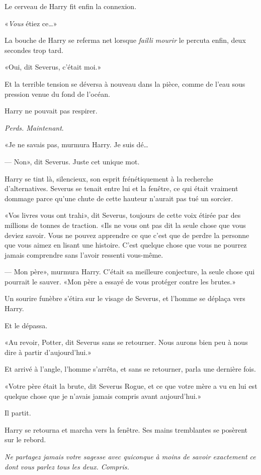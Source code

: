 Le cerveau de Harry fit enfin la connexion.

«\emph{Vous} étiez ce…»

La bouche de Harry se referma net lorsque \emph{failli mourir} le percuta enfin, deux secondes trop tard.

«Oui, dit Severus, c'était moi.»

Et la terrible tension se déversa à nouveau dans la pièce, comme de l'eau sous pression venue du fond de l'océan.

Harry ne pouvait pas respirer.

\emph{Perds. Maintenant}.

«Je ne savais pas, murmura Harry. Je suis dé…

--- Non», dit Severus. Juste cet unique mot.

Harry se tint là, silencieux, son esprit frénétiquement à la recherche d'alternatives. Severus se tenait entre lui et la fenêtre, ce qui était vraiment dommage parce qu'une chute de cette hauteur n'aurait pas tué un sorcier.

«Vos livres vous ont trahi», dit Severus, toujours de cette voix étirée par des millions de tonnes de traction. «Ils ne vous ont pas dit la seule chose que vous deviez savoir. Vous ne pouvez apprendre ce que c'est que de perdre la personne que vous aimez en lisant une histoire. C'est quelque chose que vous ne pourrez jamais comprendre sans l'avoir ressenti vous-même.

--- Mon père», murmura Harry. C'était sa meilleure conjecture, la seule chose qui pourrait le sauver. «Mon père a essayé de vous protéger contre les brutes.»

Un sourire funèbre s'étira sur le visage de Severus, et l'homme se déplaça vers Harry.

Et le dépassa.

«Au revoir, Potter, dit Severus sans se retourner. Nous aurons bien peu à nous dire à partir d'aujourd'hui.»

Et arrivé à l'angle, l'homme s'arrêta, et sans se retourner, parla une dernière fois.

«Votre père était la brute, dit Severus Rogue, et ce que votre mère a vu en lui est quelque chose que je n'avais jamais compris avant aujourd'hui.»

Il partit.

Harry se retourna et marcha vers la fenêtre. Ses mains tremblantes se posèrent sur le rebord.

\emph{Ne partagez jamais votre sagesse avec quiconque à moins de savoir exactement ce dont vous parlez tous les deux. Compris.}

